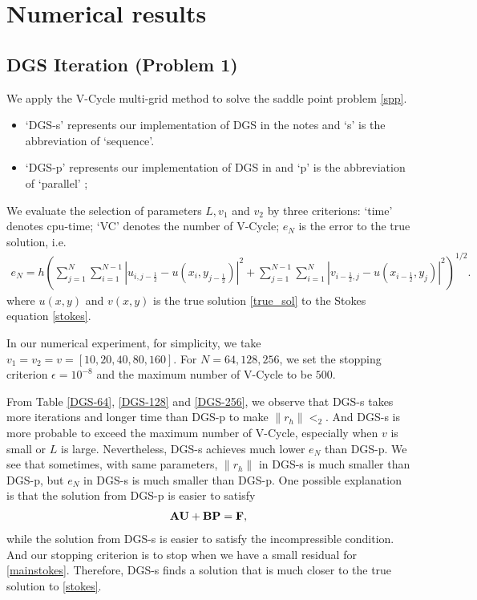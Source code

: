 \documentclass[english]{pkupaper}
\newenvironment{eqt}{\begin{equation}\begin{aligned}}{\end{aligned}\end{equation}}
\begin{document}
\section{Numerical results}
\label{sec:num}
\subsection{DGS Iteration (Problem 1)}
We apply the V-Cycle multi-grid method to solve the saddle point problem \ref{spp}. 
\begin{itemize}
\item `DGS-s' represents our implementation of DGS in the notes and `s' is the abbreviation of `sequence'.
\item `DGS-p' represents our implementation of DGS in \cite{mmfts} and `p' is the abbreviation of `parallel' ; 
\end{itemize}

We evaluate the selection of parameters $L, v_1$ and $v_2$ by three criterions: `time' denotes cpu-time; `VC' denotes the number of V-Cycle; $e_N$ is the error to the true solution, i.e.
\begin{eqt}
e _ { N } = h \left( \sum _ { j = 1 } ^ { N } \sum _ { i = 1 } ^ { N - 1 } \left| u _ { i , j - \frac { 1 } { 2 } } - u \left( x _ { i } , y _ { j - \frac { 1 } { 2 } } \right) \right| ^ { 2 } + \sum _ { j = 1 } ^ { N - 1 } \sum _ { i = 1 } ^ { N } \left| v _ { i - \frac { 1 } { 2 } , j } - u \left( x _ { i - \frac { 1 } { 2 } } , y _ { j } \right) \right| ^ { 2 } \right) ^ { 1 / 2 }.
\end{eqt}
where $u(x,y)$ and $v(x,y)$ is the true solution \ref{true_sol} to the Stokes equation \ref{stokes}.

In our numerical experiment, for simplicity, we take $v_1=v_2=v=[10, 20, 40, 80, 160]$. For $N=64, 128, 256$, we set the stopping criterion $\epsilon=10^{-8}$ and the maximum number of V-Cycle to be $500$.





From Table \ref{DGS-64}, \ref{DGS-128} and \ref{DGS-256}, we observe that  DGS-s takes more iterations and longer time than DGS-p to make $\|r_h\|<_2$. And DGS-s is more probable to exceed the maximum number of V-Cycle, especially when $v$ is small or $L$ is large. Nevertheless, DGS-s achieves much lower $e_N$ than DGS-p. We see that sometimes, with same parameters,  $\|r_h\|$ in DGS-s is much smaller than DGS-p, but $e_N$ in DGS-s is much smaller than DGS-p. One possible explanation is that the solution from DGS-p is easier to satisfy 
\begin{eqt}
\label{mainstokes}
\mfA \mfU+\mfB\mfP=\mfF,
\end{eqt}
while the solution from DGS-s is easier to satisfy the incompressible condition. And our stopping criterion is to stop when we have a small residual for \ref{mainstokes}. Therefore, DGS-s finds a solution that is much closer to the true solution to \ref{stokes}. 
\end{document}
